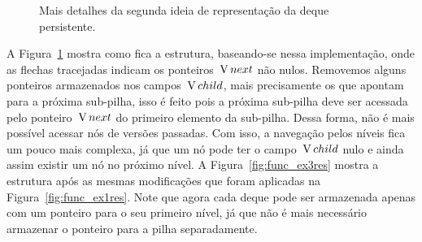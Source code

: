 \documentclass[main.tex]{subfiles}
\begin{document}
\begin{figure}[h]
\centering
{}
\caption{Mais detalhes da segunda ideia de representação da deque persistente.} \label{fig:func_ex3}
\end{figure}


A Figura~\ref{fig:func_ex3} mostra como fica a estrutura, baseando-se nessa implementação, onde as flechas tracejadas indicam os ponteiros~$\operatorname{V}{next}$ não nulos. Removemos alguns ponteiros armazenados nos campos~$\operatorname{V}{child}$, mais precisamente os que apontam para a próxima sub-pilha, isso é feito pois a próxima sub-pilha deve ser acessada pelo ponteiro~$\operatorname{V}{next}$ do primeiro elemento da sub-pilha. Dessa forma, não é mais possível acessar nós de versões passadas. Com isso, a navegação pelos níveis fica um pouco mais complexa, já que um nó pode ter o campo~$\operatorname{V}{child}$ nulo e ainda assim existir um nó no próximo nível. A Figura~\ref{fig:func_ex3res} mostra a estrutura após as mesmas modificações que foram aplicadas na Figura~\ref{fig:func_ex1res}. Note que agora cada deque pode ser armazenada apenas com um ponteiro para o seu primeiro nível, já que não é mais necessário armazenar o ponteiro para a pilha separadamente.
\end{document}
